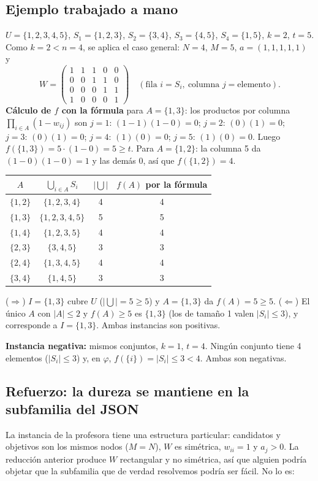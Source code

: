 \subsection{Ejemplo trabajado a mano}\label{sec:ejemplo}
\begin{ejemplo}\label{ej:reduccion}
$U=\{1,2,3,4,5\}$, $S_1=\{1,2,3\}$, $S_2=\{3,4\}$, $S_3=\{4,5\}$, $S_4=\{1,5\}$, $k=2$, $t=5$. Como $k=2<n=4$, se aplica el caso general: $N=4$, $M=5$, $a=(1,1,1,1,1)$ y
\[
W=\begin{pmatrix}
1&1&1&0&0\\
0&0&1&1&0\\
0&0&0&1&1\\
1&0&0&0&1
\end{pmatrix}\quad(\text{fila } i=S_i,\ \text{columna } j=\text{elemento}).
\]
\textbf{Cálculo de $f$ con la fórmula} para $A=\{1,3\}$: los productos por columna $\prod_{i\in A}(1-w_{ij})$ son
$j{=}1{:}\,(1-1)(1-0)=0$; $j{=}2{:}\,(0)(1)=0$; $j{=}3{:}\,(0)(1)=0$; $j{=}4{:}\,(1)(0)=0$; $j{=}5{:}\,(1)(0)=0$. Luego $f(\{1,3\})=5\cdot(1-0)=5\ge t$. Para $A=\{1,2\}$: la columna 5 da $(1-0)(1-0)=1$ y las demás $0$, así que $f(\{1,2\})=4$.

\begin{center}
\begin{tabular}{@{}cccc@{}}
\toprule
$A$ & $\bigcup_{i\in A}S_i$ & $|\bigcup|$ & $f(A)$ por la fórmula\\
\midrule
$\{1,2\}$ & $\{1,2,3,4\}$ & 4 & 4\\
$\{1,3\}$ & $\{1,2,3,4,5\}$ & 5 & 5\\
$\{1,4\}$ & $\{1,2,3,5\}$ & 4 & 4\\
$\{2,3\}$ & $\{3,4,5\}$ & 3 & 3\\
$\{2,4\}$ & $\{1,3,4,5\}$ & 4 & 4\\
$\{3,4\}$ & $\{1,4,5\}$ & 3 & 3\\
\bottomrule
\end{tabular}
\end{center}
($\Rightarrow$) $I=\{1,3\}$ cubre $U$ ($|\bigcup|=5\ge5$) y $A=\{1,3\}$ da $f(A)=5\ge 5$. ($\Leftarrow$) El único $A$ con $|A|\le2$ y $f(A)\ge 5$ es $\{1,3\}$ (los de tamaño 1 valen $|S_i|\le 3$), y corresponde a $I=\{1,3\}$. Ambas instancias son positivas.

\textbf{Instancia negativa:} mismos conjuntos, $k=1$, $t=4$. Ningún conjunto tiene 4 elementos ($|S_i|\le3$) y, en $\varphi$, $f(\{i\})=|S_i|\le 3<4$. Ambas son negativas.
\end{ejemplo}

\subsection{Refuerzo: la dureza se mantiene en la subfamilia del JSON}\label{sec:refuerzo}
La instancia de la profesora tiene una estructura particular: candidatos y objetivos son los mismos nodos ($M=N$), $W$ es simétrica, $w_{ii}=1$ y $a_j>0$. La reducción anterior produce $W$ rectangular y no simétrica, así que alguien podría objetar que la subfamilia que de verdad resolvemos podría ser fácil. No lo es:

